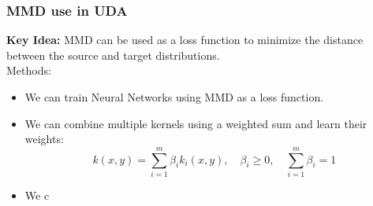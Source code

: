 \documentclass{beamer}
\begin{document}
\begin{frame}
    \frametitle{MMD use in UDA}
    \textbf{Key Idea:} MMD can be used as a loss function to minimize the distance between the source and target distributions.\\

    Methods:
    \begin{itemize}
        \item We can train Neural Networks using MMD as a loss function.
        \item We can combine multiple kernels using a weighted sum and learn their weights: 
        \[
        k(x,y) = \sum_{i=1}^m \beta_i k_i(x,y), \quad \beta_i \geq 0, \quad \sum_{i=1}^m \beta_i = 1
        \]
        \item We c
    \end{itemize}

    


\end{frame}
\end{document}
